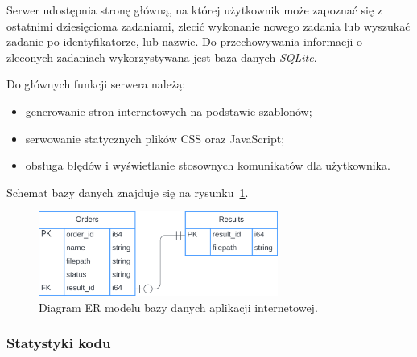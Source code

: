             Serwer udostępnia stronę główną, na której użytkownik może zapoznać się z ostatnimi dziesięcioma zadaniami, zlecić wykonanie nowego zadania lub wyszukać zadanie po identyfikatorze, lub nazwie. Do przechowywania informacji o zleconych zadaniach wykorzystywana jest baza danych \textit{SQLite}.

            Do głównych funkcji serwera należą:
            \begin{itemize}
                \item generowanie stron internetowych na podstawie szablonów;
                \item serwowanie statycznych plików CSS oraz JavaScript;
                \item obsługa błędów i wyświetlanie stosownych komunikatów dla użytkownika.
            \end{itemize}

            Schemat bazy danych znajduje się na rysunku~\ref{Picture:App:Database}.

            \begin{figure}[!htb]
                \begin{center}
                    \includegraphics[width=0.7\textwidth]{tex/pictures/app/database.png}
                \end{center}
                \caption{
                    Diagram ER modelu bazy danych aplikacji internetowej.
                }\label{Picture:App:Database}
              \end{figure}

              \subsubsection{Statystyki kodu}



